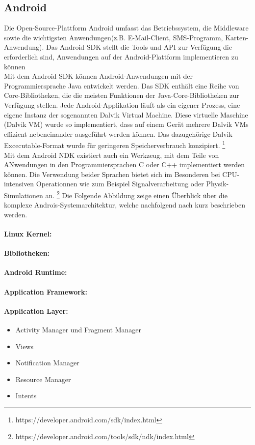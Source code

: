 \subsection{Android}
Die Open-Source-Plattform Android umfasst das Betriebssystem, die Middleware sowie die wichtigsten Anwendungen(z.B. E-Mail-Client, SMS-Programm, Karten-Anwendung). Das Android \gls{SDK} stellt die Tools und \gls{API} zur Verfügung die erforderlich sind, Anwendungen auf der Android-Plattform implementieren zu können \cite{androidwww}\\
Mit dem Android \gls{SDK} können Android-Anwendungen mit der Programmiersprache Java entwickelt werden. Das \gls{SDK} enthält eine Reihe von Core-Bibliotheken, die die meisten Funktionen der Java-Core-Bibliotheken zur Verfügung stellen. Jede Android-Applikation läuft als ein eigener Prozess, eine eigene Instanz der sogenannten Dalvik Virtual Machine. Diese virtuelle Maschine (Dalvik VM) wurde so implementiert, dass auf einem Gerät mehrere Dalvik VMs effizient nebeneinander ausgeführt werden können. Das dazugehörige Dalvik Excecutable-Format wurde für geringeren Speicherverbrauch konzipiert. \footnote{https://developer.android.com/sdk/index.html}\cite{androidwww} \\ 
Mit dem Android \gls{NDK} existiert auch ein Werkzeug, mit dem Teile von ANwendungen in den Programmiersprachen C oder C++ implementiert werden können. Die Verwendung beider Sprachen bietet sich im Besonderen bei CPU-intensiven Operationnen wie zum Beispiel Signalverarbeitung oder Physik-Simulationen an. \footnote{https://developer.android.com/tools/sdk/ndk/index.html}
Die Folgende Abbildung zeige einen Überblick über die komplexe Androis-Systemarchitektur, welche nachfolgend nach \cite{android} kurz beschrieben werden.
\paragraph{Linux Kernel: }
\paragraph{Bibliotheken: }
\paragraph{Android Runtime: }
\paragraph{Application Framework: }
\paragraph{Application Layer: }
\begin{itemize}
	\item Activity Manager und Fragment Manager
	\item Views
	\item Notification Manager
	\item Resource Manager
	\item Intents
\end{itemize}

